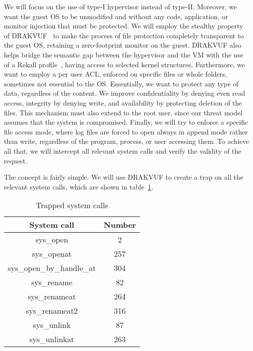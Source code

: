 \par We will focus on the use of type-I hypervisor instead of type-II. Moreover, we want the guest \ac{OS} to be unmodified and without any code, application, or monitor injection that must be protected. We will employ the stealthy property of DRAKVUF~\cite{lengyel2014drakvuf} to make the process of file protection completely transparent to the guest \ac{OS}, retaining a zero-footprint monitor on the guest. DRAKVUF also helps bridge the semantic gap between the hypervisor and the \ac{VM} with the use of a Rekall profile~\cite{rekall}, having access to selected kernel structures. Furthermore, we want to employ a per user \ac{ACL}, enforced on specific files or whole folders, sometimes not essential to the \ac{OS}. Essentially, we want to protect any type of data, regardless of the content. We improve confidentiality by denying even read access, integrity by denying write, and availability by protecting deletion of the files. This mechanism must also extend to the root user, since our threat model assumes that the system is compromised. Finally, we will try to enforce a specific file access mode, where log files are forced to open always in append mode rather than write, regardless of the program, process, or user accessing them. To achieve all that, we will intercept all relevant system calls and verify the validity of the request. 

\par The concept is fairly simple. We will use DRAKVUF to create a trap on all the relevant system calls, which are shown in table~\ref{tbl:syscalls}.

\begin{table}[h]
	\centering
	\caption{Trapped system calls}
	\label{tbl:syscalls}
	\begin{tabular}{cc}
		\toprule
		System call & Number \\
		\hline
		sys\_open & 2 \\ sys\_openat & 257 \\ sys\_open\_by\_handle\_at & 304 \\
		sys\_rename & 82 \\ sys\_renameat & 264 \\  sys\_renameat2 & 316 \\ 
		sys\_unlink & 87 \\ sys\_unlinkat & 263 \\
		\bottomrule
\end{tabular}	
\end{table}

